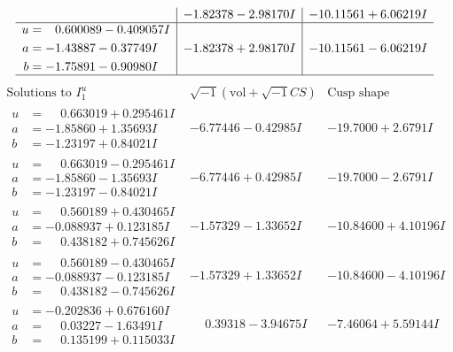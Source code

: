 \documentclass[1p]{elsarticle_modified}
\theoremstyle{definition}
\newcommand{\I}{\sqrt{-1}}
\begin{document}
$$\begin{array}{c|c|c}
 & -1.82378 - 2.98170 I & -10.11561 + 6.06219 I \\ \hline\begin{aligned}
u &= \phantom{-}0.600089 - 0.409057 I \\
a &= -1.43887 - 0.37749 I \\
b &= -1.75891 - 0.90980 I\end{aligned}
 & -1.82378 + 2.98170 I & -10.11561 - 6.06219 I\\
 \hline 
 \end{array}$$\newpage$$\begin{array}{c|c|c}  
\text{Solutions to }I^u_{1}& \I (\text{vol} + \sqrt{-1}CS) & \text{Cusp shape}\\
 \hline 
\begin{aligned}
u &= \phantom{-}0.663019 + 0.295461 I \\
a &= -1.85860 + 1.35693 I \\
b &= -1.23197 + 0.84021 I\end{aligned}
 & -6.77446 - 0.42985 I & -19.7000 + 2.6791 I \\ \hline\begin{aligned}
u &= \phantom{-}0.663019 - 0.295461 I \\
a &= -1.85860 - 1.35693 I \\
b &= -1.23197 - 0.84021 I\end{aligned}
 & -6.77446 + 0.42985 I & -19.7000 - 2.6791 I \\ \hline\begin{aligned}
u &= \phantom{-}0.560189 + 0.430465 I \\
a &= -0.088937 + 0.123185 I \\
b &= \phantom{-}0.438182 + 0.745626 I\end{aligned}
 & -1.57329 - 1.33652 I & -10.84600 + 4.10196 I \\ \hline\begin{aligned}
u &= \phantom{-}0.560189 - 0.430465 I \\
a &= -0.088937 - 0.123185 I \\
b &= \phantom{-}0.438182 - 0.745626 I\end{aligned}
 & -1.57329 + 1.33652 I & -10.84600 - 4.10196 I \\ \hline\begin{aligned}
u &= -0.202836 + 0.676160 I \\
a &= \phantom{-}0.03227 - 1.63491 I \\
b &= \phantom{-}0.135199 + 0.115033 I\end{aligned}
 & \phantom{-}0.39318 - 3.94675 I & -7.46064 + 5.59144 I \\ \hline\begin{aligned}

\end{aligned}
\end{array}$$
\end{document}
